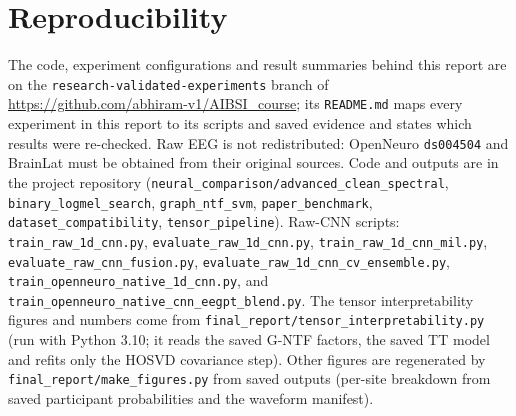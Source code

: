 \documentclass[10pt,twocolumn,a4paper]{article}
\newcommand{\code}[1]{\texttt{\small #1}}
\begin{document}
\section*{Reproducibility}
\label{sec:repro}
The code, experiment configurations and result summaries behind this report are on the \code{research-validated-experiments} branch of \url{https://github.com/abhiram-v1/AIBSI_course}; its \code{README.md} maps every experiment in this report to its scripts and saved evidence and states which results were re-checked. Raw EEG is not redistributed: OpenNeuro \code{ds004504} and BrainLat must be obtained from their original sources. Code and outputs are in the project repository (\code{neural\_comparison/advanced\_clean\_spectral}, \code{binary\_logmel\_search}, \code{graph\_ntf\_svm}, \code{paper\_benchmark}, \code{dataset\_compatibility}, \code{tensor\_pipeline}). Raw-CNN scripts: \code{train\_raw\_1d\_cnn.py}, \code{evaluate\_raw\_1d\_cnn.py}, \code{train\_raw\_1d\_cnn\_mil.py}, \code{evaluate\_raw\_cnn\_fusion.py}, \code{evaluate\_raw\_1d\_cnn\_cv\_ensemble.py}, \code{train\_openneuro\_native\_1d\_cnn.py}, and \code{train\_openneuro\_native\_cnn\_eegpt\_blend.py}. The tensor interpretability figures and numbers come from \code{final\_report/tensor\_interpretability.py} (run with Python 3.10; it reads the saved G-NTF factors, the saved TT model and refits only the HOSVD covariance step). Other figures are regenerated by \code{final\_report/make\_figures.py} from saved outputs (per-site breakdown from saved participant probabilities and the waveform manifest).
\end{document}
